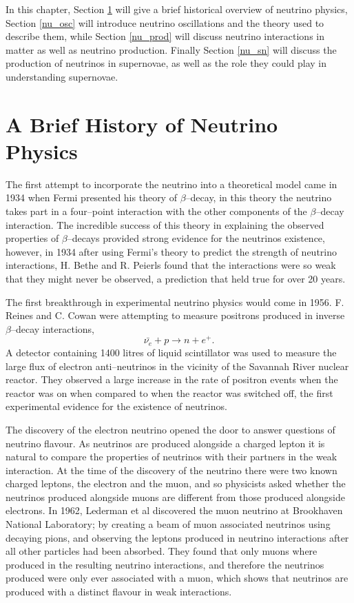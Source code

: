 In this chapter, Section \ref{nu_hist} will give a brief historical overview of 
neutrino physics, Section \ref{nu_osc} will introduce neutrino oscillations
and the theory used to describe them, while Section \ref{nu_prod} will discuss
neutrino interactions in matter as well as neutrino production. Finally Section
\ref{nu_sn} will discuss the production of neutrinos in supernovae, as well as
the role they could play in understanding supernovae.

\section{A Brief History of Neutrino Physics} \label{nu_hist}

The first attempt to incorporate the neutrino into a theoretical model came in
1934 when Fermi presented his theory of \(\beta\)--decay, in this theory the 
neutrino takes part in a four--point interaction with the other components of 
the \(\beta\)--decay interaction. The incredible success of this theory in
explaining the observed properties of \(\beta\)--decays provided strong evidence 
for the neutrinos existence, however, in 1934 after using Fermi's  theory to 
predict the strength of neutrino interactions, H. Bethe and R. Peierls found 
that the interactions were so weak that they might never be observed, a 
prediction that held true for over 20 years.%

The first breakthrough in experimental neutrino physics would come in 1956. F.
Reines and C. Cowan were attempting to measure positrons produced in inverse 
\(\beta\)--decay interactions,
\begin{equation}
	\bar{\nu_e} + p \rightarrow n + e^+.
\end{equation}
A detector containing 1400 litres of liquid scintillator was used to measure the 
large flux of electron anti--neutrinos in the vicinity of the Savannah River 
nuclear reactor. They observed a large increase in the rate of positron events 
when the reactor was on when compared to when the reactor was switched off, the 
first experimental evidence for the existence of neutrinos. %

The discovery of the electron neutrino opened the door to answer questions of 
neutrino flavour. As neutrinos are produced alongside a charged lepton it is 
natural to compare the properties of neutrinos with their partners in the weak
interaction. At the time of the discovery of the neutrino there were two known
charged leptons, the electron and the muon, and so physicists asked whether the
neutrinos produced alongside muons are different from those produced alongside
electrons. In 1962, Lederman et al discovered the muon neutrino at Brookhaven
National Laboratory; by creating a beam of muon associated neutrinos using 
decaying pions, and observing the leptons produced in neutrino interactions 
after all other particles had been absorbed. They found that only muons where 
produced in the resulting neutrino interactions, and therefore the neutrinos 
produced were only ever associated with a muon, which shows that neutrinos are 
produced with a distinct flavour in weak interactions.

